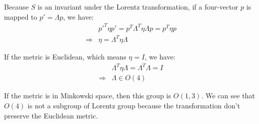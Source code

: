 \documentclass[]{ctexart}
\begin{document}
		\subsubsection{}
			Because $S$ is an invariant under the Lorentz transformation, if a four-vector $p$ is mapped to $p'=\Lambda p$, we have:
				\begin{equation*}
				\begin{aligned}
					&p'^T\eta p'=p^T\Lambda^T \eta \Lambda p=p^T\eta p\\
					\Rightarrow &\eta=\Lambda^T \eta \Lambda
				\end{aligned}
				\end{equation*}
			
			If the metric is Euclidean, which means $\eta =I$, we have:
				\begin{equation*}
				\begin{aligned}
					&\Lambda^T \eta \Lambda=\Lambda^T \Lambda=I\\
					\Rightarrow &\Lambda\in O(4)
				\end{aligned}
				\end{equation*}
			
			If the metric is in Minkowski space, then this group is $O(1,3)$. We can see that $O(4)$ is not a subgroup of Lorentz group because the transformation don't preserve the Euclidean metric. 
			
\end{document}
